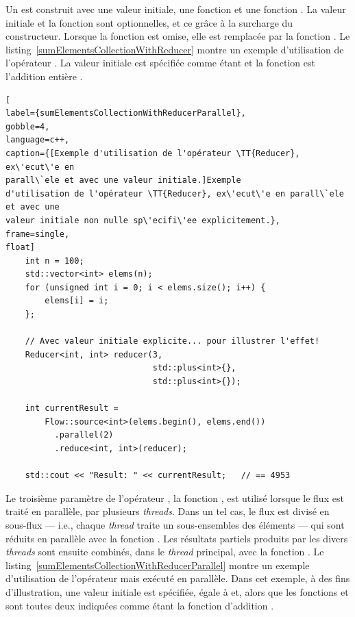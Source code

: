 Un  est construit avec une valeur initiale, une fonction  et une fonction . La valeur initiale et la fonction  sont optionnelles, et ce gr\^ace \`a la surcharge du constructeur. Lorsque la fonction  est omise, elle est remplac\'ee par la fonction . Le listing~\ref{sumElementsCollectionWithReducer} montre un exemple d'utilisation de l'op\'erateur . La valeur initiale est sp\'ecifi\'ee comme \'etant  et la fonction  est l'addition enti\`ere . 


\begin{lstlisting}[
label={sumElementsCollectionWithReducerParallel},
gobble=4,
language=c++,
caption={[Exemple d'utilisation de l'opérateur \TT{Reducer}, ex\'ecut\'e en
parall\`ele et avec une valeur initiale.]Exemple
d'utilisation de l'opérateur \TT{Reducer}, ex\'ecut\'e en parall\`ele et avec une
valeur initiale non nulle sp\'ecifi\'ee explicitement.},
frame=single,
float]
    int n = 100;
    std::vector<int> elems(n);
    for (unsigned int i = 0; i < elems.size(); i++) {
        elems[i] = i;
    };

    // Avec valeur initiale explicite... pour illustrer l'effet!
    Reducer<int, int> reducer(3, 
                              std::plus<int>{}, 
                              std::plus<int>{});

	int currentResult =
		Flow::source<int>(elems.begin(), elems.end())
          .parallel(2)
          .reduce<int, int>(reducer); 
	
	std::cout << "Result: " << currentResult;	// == 4953
\end{lstlisting}


Le troisi\`eme param\`etre de l'op\'erateur , la fonction , est utilis\'e lorsque le flux est trait\'e en parall\`ele, par plusieurs \emph{threads}. Dans un tel cas, le flux est divis\'e en sous-flux --- i.e., chaque \emph{thread} traite un sous-ensembles des éléments --- qui sont r\'eduits en parall\`ele avec la fonction . Les r\'esultats partiels produits par les divers \emph{threads} sont ensuite combin\'es, dans le \emph{thread} principal, avec la fonction . Le listing~\ref{sumElementsCollectionWithReducerParallel} montre un exemple d'utilisation de l'op\'erateur  mais ex\'ecut\'e en parall\`ele. Dans cet exemple, \`a des fins d'illustration, une valeur initiale est sp\'ecifi\'ee, \'egale \`a  et, alors que les fonctions  et  sont toutes deux indiqu\'ees comme \'etant la fonction d'addition . 

